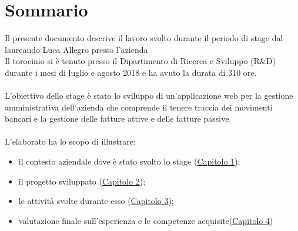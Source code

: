
\cleardoublepage
{}
{}
\begingroup
\let\clearpage\relax
\let\cleardoublepage\relax
\let\cleardoublepage\relax

\chapter*{Sommario}

Il presente documento descrive il lavoro svolto durante il periodo di stage dal laureando
Luca Allegro presso l'azienda \vic{} \\
Il torocinio si è tenuto presso il Dipartimento di Ricerca e Sviluppo (R\&D) durante i mesi di
luglio e agosto 2018 e ha avuto la durata di 310 ore.
\\ \\
L’obiettivo dello stage è stato lo sviluppo di un’applicazione web per la gestione amministrativa
dell'azienda che comprende il tenere traccia dei movimenti bancari e la gestione delle fatture attive e 
delle fatture passive.
\\ \\
L'elaborato ha lo scopo di illustrare:
\begin{itemize}
	\item il contesto aziendale dove è stato svolto lo stage ({\hyperref[cap:azienda]{Capitolo 1}});
	\item il progetto sviluppato ({\hyperref[cap:progetto]{Capitolo 2}});
	\item le attività svolte durante esso ({\hyperref[cap:svolgimento]{Capitolo 3}});
	\item valutazione finale sull'esperienza e le competenze acquisite({\hyperref[cap:valutazione]{Capitolo 4}})
\end{itemize}

\vspace{2cm}

